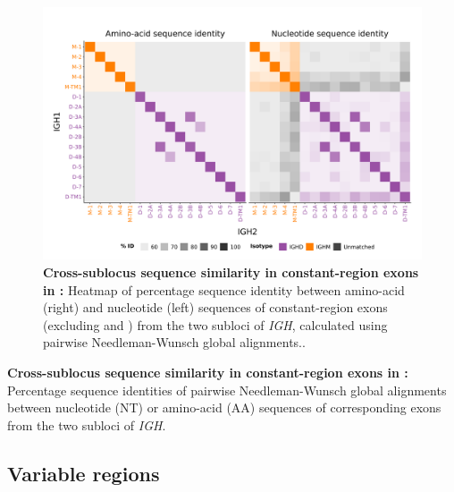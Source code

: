 	\begin{figure}
	\centering
	\includegraphics[width = \textwidth]{_Figures/png/nfu-ch-aln}
	\caption[Cross-sublocus sequence similarity in constant-region exons in \Nfu \textit{IGH}]{\textbf{Cross-sublocus sequence similarity in constant-region exons in \Nfu:} Heatmap of percentage sequence identity between amino-acid (right) and nucleotide (left) sequences of constant-region exons (excluding  and ) from the two subloci of \Nfu \textit{IGH}, calculated using pairwise Needleman-Wunsch global alignments..}
	\label{fig:nfu-ch-aln}
	\end{figure}
	
	\begin{table}\centering
		\caption[Cross-sublocus sequence similarity between corresponding constant-region exons in \Nfu \textit{IGH}]{\textbf{Cross-sublocus sequence similarity in constant-region exons in \Nfu:} Percentage sequence identities of pairwise Needleman-Wunsch global alignments between nucleotide (NT) or amino-acid (AA) sequences of corresponding exons from the two subloci of \Nfu \textit{IGH}.}
	
	\label{tab:nfu-ch-aln}
	\end{table}
	
\subsection{Variable regions}
\label{sec:nfu-locus-variable}

	
